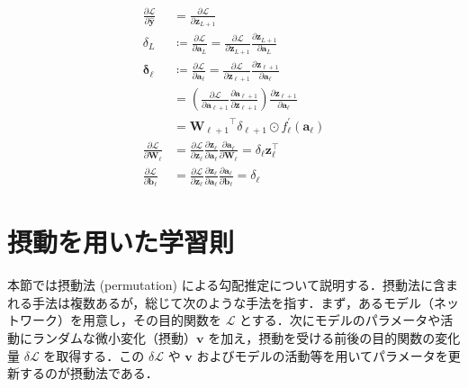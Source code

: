 \begin{align}
\frac{\partial \mathcal{L}}{\partial \hat{\mathbf{y}}}&=\frac{\partial \mathcal{L}}{\partial \mathbf{z}_{L+1}}\\
\delta_L&\coloneqq \frac{\partial \mathcal{L}}{\partial \mathbf{a}_L}=\frac{\partial \mathcal{L}}{\partial \mathbf{z}_{L+1}} \frac{\partial \mathbf{z}_{L+1}}{\partial \mathbf{a}_L}\\
\mathbf{\delta}_\ell&\coloneqq \frac{\partial \mathcal{L}}{\partial \mathbf{a}_{\ell}}=\frac{\partial \mathcal{L}}{\partial \mathbf{z}_{\ell+1}} \frac{\partial \mathbf{z}_{\ell+1}}{\partial \mathbf{a}_\ell}\\
&=\left(\frac{\partial \mathcal{L}}{\partial \mathbf{a}_{\ell+1}}\frac{\partial \mathbf{a}_{\ell+1}}{\partial \mathbf{z}_{\ell+1}}\right)\frac{\partial \mathbf{z}_{\ell+1}}{\partial \mathbf{a}_{\ell}}\\
&={\mathbf{W}_{\ell+1}}^\top \delta_{\ell+1} \odot f_\ell^{\prime}\left(\mathbf{a}_{\ell}\right)\\
\frac{\partial \mathcal{L}}{\partial \mathbf{W}_\ell}&=\frac{\partial \mathcal{L}}{\partial \mathbf{z}_\ell} \frac{\partial \mathbf{z}_\ell}{\partial \mathbf{a}_\ell} \frac{\partial \mathbf{a}_\ell}{\partial \mathbf{W}_\ell}=\delta_\ell \mathbf{z}_\ell^\top\\
\frac{\partial \mathcal{L}}{\partial \mathbf{b}_\ell}&=\frac{\partial \mathcal{L}}{\partial \mathbf{z}_\ell} \frac{\partial \mathbf{z}_\ell}{\partial \mathbf{a}_\ell} \frac{\partial \mathbf{a}_\ell}{\partial \mathbf{b}_\ell}=\delta_\ell
\end{align}
\section{摂動を用いた学習則}
本節では摂動法 (permutation) による勾配推定について説明する．摂動法に含まれる手法は複数あるが，総じて次のような手法を指す．まず，あるモデル（ネットワーク）を用意し，その目的関数を $\mathcal{L}$ とする．次にモデルのパラメータや活動にランダムな微小変化（摂動）$\mathbf{v}$ を加え，摂動を受ける前後の目的関数の変化量 $\delta \mathcal{L}$ を取得する．この $\delta \mathcal{L}$ や $\mathbf{v}$ およびモデルの活動等を用いてパラメータを更新するのが摂動法である．
